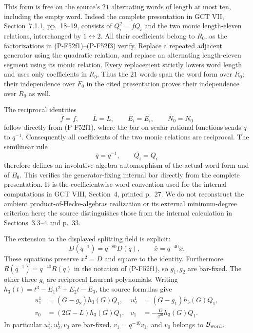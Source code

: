 \documentclass[11pt,a4paper]{article}
\begin{document}
This form is free on the source's $21$ alternating words of
length at most ten, including the empty word. Indeed the
complete presentation in GCT VII, Section~7.1.1, pp.~18--19,
consists of $Q_i^2=fQ_i$ and the two monic length-eleven
relations, interchanged by $1\leftrightarrow2$.
All their coefficients belong to $R_0$, as the factorizations
in (P-F52f1)--(P-F52f3) verify. Replace a repeated adjacent
generator using the quadratic relation, and replace an
alternating length-eleven segment using its monic relation.
Every replacement strictly lowers word length and uses only
coefficients in $R_0$. Thus the $21$ words span the word
form over $R_0$; their independence over $F_0$ in the cited
presentation proves their independence over $R_0$ as well.

The reciprocal identities
\[
 \overline f=f,\qquad \overline L=L,\qquad
 \overline E_i=E_i,\qquad \overline N_0=N_0
                                                               \tag{P-F52aj}
\]
follow directly from (P-F52f1), where the bar on scalar
rational functions sends $q$ to $q^{-1}$.
Consequently all coefficients of the two monic relations
are reciprocal. The semilinear rule
\[
             \overline q=q^{-1},\qquad
             \overline {Q_i}=Q_i
                                                               \tag{P-F52ak}
\]
therefore defines an involutive algebra automorphism of
the actual word form and of $B_0$.
This verifies the generator-fixing internal bar directly from
the complete presentation. It is the coefficientwise word
convention used for the internal computations in GCT VIII,
Section~4, printed p.~27. We do not reconstruct the ambient
product-of-Hecke-algebras realization or its external
minimum-degree criterion here; the source distinguishes those
from the internal calculation in Sections~3.3--4 and p.~33.

The extension to the displayed splitting field is explicit:
\[
             D(q^{-1})=q^{-80}D(q),\qquad
             \overline x=q^{-40}x.
                                                               \tag{P-F52al}
\]
These equations preserve $x^2=D$ and square to the identity.
Furthermore $R(q^{-1})=q^{-40}R(q)$ in the notation of
(P-F52f1), so $g_1,g_2$ are bar-fixed. The other three
$g_i$ are reciprocal Laurent polynomials.
Writing $h_3(t)=t^3-E_1t^2+E_2t-E_3$, the source formulas
give
\[
 \begin{aligned}
 u_1^1&=(G-g_2)h_3(G)Q_1,
       &u_2^1&=(G-g_1)h_3(G)Q_1,\\
 v_0&=(2G-L)h_3(G)Q_1,
       &v_1&=-\frac{D}{q^{20}}h_3(G)Q_1.
 \end{aligned}                                                  \tag{P-F52am}
\]
In particular $u_1^1,u_2^1,v_0$ are bar-fixed,
$\overline {v_1}=q^{-40}v_1$, and $v_0$ belongs to
$\mathcal B_{\rm word}$.
\end{document}
